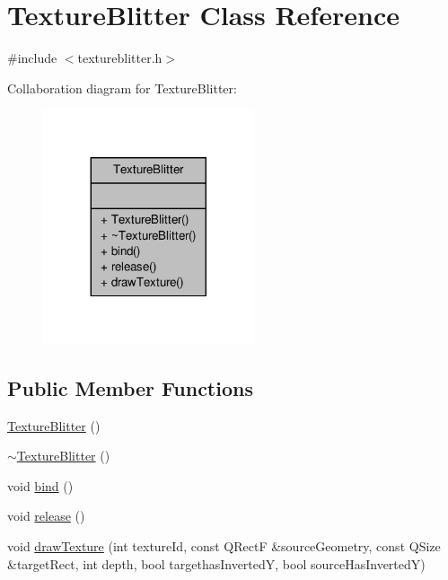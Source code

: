 \hypertarget{classTextureBlitter}{\section{Texture\-Blitter Class Reference}
\label{classTextureBlitter}
}


{\ttfamily \#include $<$textureblitter.\-h$>$}



Collaboration diagram for Texture\-Blitter\-:
\nopagebreak
\begin{figure}[H]
\begin{center}
\leavevmode
\includegraphics[width=176pt]{classTextureBlitter__coll__graph}
\end{center}
\end{figure}
\subsection*{Public Member Functions}
\begin{DoxyCompactItemize}
\item 
\hyperlink{classTextureBlitter_a4e6e3fad09aa0fe61d86ef9e540b7624}{Texture\-Blitter} ()
\item 
\hyperlink{classTextureBlitter_a1af0b8757619a773db318647a953b6b3}{$\sim$\-Texture\-Blitter} ()
\item 
void \hyperlink{classTextureBlitter_aa71be8ffe16fc0161fa8a4cc89e4656d}{bind} ()
\item 
void \hyperlink{classTextureBlitter_acd6756b8a64f87fcdd8aa09ab9a366a7}{release} ()
\item 
void \hyperlink{classTextureBlitter_a0cf7d65fbe8eeefa4d690d60471750d2}{draw\-Texture} (int texture\-Id, const Q\-Rect\-F \&source\-Geometry, const Q\-Size \&target\-Rect, int depth, bool targethas\-Inverted\-Y, bool source\-Has\-Inverted\-Y)
\end{DoxyCompactItemize}



